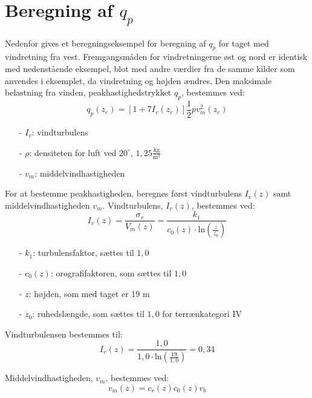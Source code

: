 \chapter{Beregning af $q_p$}
Nedenfor gives et beregningseksempel for beregning af $q_p$ for taget med vindretning fra vest. Fremgangsmåden for vindretningerne øst og nord er identisk med nedenstående eksempel, blot med andre værdier fra de samme kilder som anvendes i eksemplet, da vindretning og højden ændres.
\newline
\newline
Den maksimale belastning fra vinden, peakhastighedstrykket $q_p$, bestemmes ved:
\begin{equation}
	q_p(z_e)=[1+7I_v(z_e)]\frac{1}{2}pv_m^2(z_e)
\end{equation}
\begin{itemize}
	\item[-] $I_v$: vindturbulens
	\item[-] $\rho$: densiteten for luft ved $20^{\circ}$, $1,\!25 \frac{\text{kg}}{\text{m}^3}$
	\item[-] $v_m$: middelvindhastigheden
\end{itemize}
For at bestemme peakhastigheden, beregnes først vindturbulens $I_v(z)$ samt middelvindhastigheden $v_m$.
\newline
\newline
Vindturbulens, $I_v(z)$, bestemmes ved:
\begin{equation}
	I_v(z)=\frac{\sigma_v}{V_m(z)}=\frac{k_1}{c_0(z)\cdot \text{ln}(\frac{z}{z_0})}
\end{equation}
\begin{itemize}
	\item[-] $k_1$: turbulensfaktor, sættes til $1,\!0$ \citep[ kapitel 4.4]{EU91}
	\item[-] $c_0(z)$: orografifaktoren, som sættes til $1,\!0$ \citep[ kapitel 4.3.1]{EU91}
	\item[-] $z$: højden, som med taget er 19 m
	\item[-] $z_0$: ruhedslængde, som sættes til $1,\!0$ for terrænkategori IV \citep[ tabel 4.1 kapitel 4.3.2]{EU91}
\end{itemize}
Vindturbulensen bestemmes til:
\begin{equation}
	I_v(z)=\frac{1,0}{1,0\cdot \text{ln}(\frac{19}{1,0})}=0,\!34
\end{equation}

Middelvindhastigheden, $v_m$, bestemmes ved:
\begin{equation}
	v_m(z)=c_r(z)c_0(z)v_b
\end{equation}


